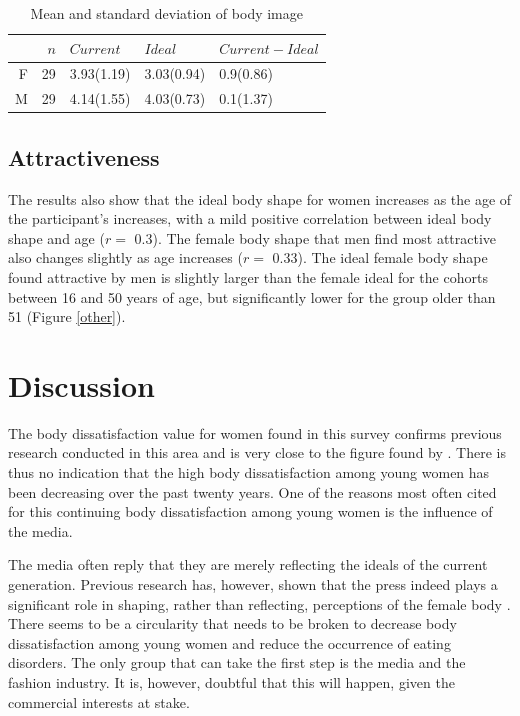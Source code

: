 \documentclass[a4paper, jou, 11pt]{apa6}
\begin{document}
\begin{table}[ht]
\centering
\begin{tabular}{rrlll}
  \hline
 & $n$ & $Current$ & $Ideal$ & $Current-Ideal$ \\ 
  \hline
F &  29 & 3.93(1.19) & 3.03(0.94) & 0.9(0.86) \\ 
  M &  29 & 4.14(1.55) & 4.03(0.73) & 0.1(1.37) \\ 
   \hline
\end{tabular}
\caption{Mean and standard deviation of body image} 
\label{results}
\end{table}

\subsection{Attractiveness}
\label{sec:org05127cd}
The results also show that the ideal body shape for women increases as the age of the participant's increases, with a mild positive correlation between ideal body shape and age (\(r=\) 0.3). The female body shape that men find most attractive also changes slightly as age increases (\(r=\) 0.33). The ideal female body shape found attractive by men is slightly larger than the female ideal for the cohorts between 16 and 50 years of age, but significantly lower for the group older than 51 (Figure \ref{other}).
\section{Discussion}
\label{sec:org6048a92}
The body dissatisfaction value for women found in this survey confirms previous research conducted in this area and is very close to the figure found by . There is thus no indication that the high body dissatisfaction among young women has been decreasing over the past twenty years. One of the reasons most often cited for this continuing body dissatisfaction among young women is the influence of the media. 

The media often reply that they are merely reflecting the ideals of the current generation. Previous research has, however, shown that the press indeed plays a significant role in shaping, rather than reflecting, perceptions of the female body \cite{turner_influence_1997}. There seems to be a circularity that needs to be broken to decrease body dissatisfaction among young women and reduce the occurrence of eating disorders. The only group that can take the first step is the media and the fashion industry. It is, however, doubtful that this will happen, given the commercial interests at stake.
\end{document}
